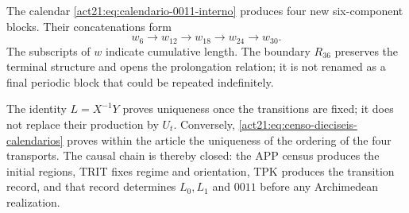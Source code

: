 The calendar \eqref{act21:eq:calendario-0011-interno} produces four new
six-component blocks. Their concatenations form
\[
 w_6\longrightarrow w_{12}\longrightarrow w_{18}
 \longrightarrow w_{24}\longrightarrow w_{30}.
\]
The subscripts of \(w\) indicate cumulative length. The boundary \(R_{36}\) preserves the terminal structure and opens the prolongation relation; it is not renamed as a final periodic block that could be repeated indefinitely.

The identity \(L=X^{-1}Y\) proves uniqueness once the transitions are
fixed; it does not replace their production by \(U_t\). Conversely,
\eqref{act21:eq:censo-dieciseis-calendarios} proves within the article the uniqueness
of the ordering of the four transports. The causal chain is thereby closed:
the APP census produces the initial regions, TRIT fixes regime and
orientation, TPK produces the transition record, and that record
determines \(L_0,L_1\) and \(0011\) before any Archimedean realization.
